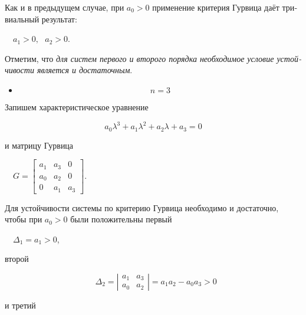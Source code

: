 \documentclass[a4paper]{article}
\newcommand\liststyleWWviiiNumxxxvii{%
\renewcommand\theenumi{\arabic{enumi}}
\renewcommand\theenumii{\arabic{enumii}}
\renewcommand\theenumiii{\arabic{enumiii}}
\renewcommand\labelitemi{}
\renewcommand\labelenumi{\theenumi.}
\renewcommand\labelenumii{\theenumii.}
\renewcommand\labelenumiii{\theenumiii.}
}
\begin{document}
{\begin{russian}\sffamily
Как и в предыдущем случае, при  $a_0>0$ применение критерия Гурвица даёт тривиальный результат:
\end{russian}}

{\begin{russian}\sffamily
\ \  $a_1>0,\text{   }a_2>0$.
\end{russian}}

{\begin{russian}\sffamily
Отметим, что \textit{для систем первого и второго порядка необходимое условие устойчивости является и достаточным}.
\end{russian}}

\liststyleWWviiiNumxxxvii
\begin{itemize}
\item \begin{equation*}
n=3
\end{equation*}
\end{itemize}
{\begin{russian}\sffamily
Запишем характеристическое уравнение
\end{russian}}

\begin{equation*}
a_0λ^3+a_1λ^2+a_2λ+a_3=0
\end{equation*}
{\begin{russian}\sffamily
и матрицу Гурвица
\end{russian}}

{\begin{russian}\sffamily
\ \  $G=\left[\begin{matrix}a_1&a_3&0\\a_0&a_2&0\\0&a_1&a_3\end{matrix}\right]$.
\end{russian}}

{\begin{russian}\sffamily
Для устойчивости системы по критерию Гурвица необходимо и достаточно, чтобы при  $a_0>0$ были положительны первый 
\end{russian}}

{\begin{russian}\sffamily
\ \  $Δ_1=a_1>0$,
\end{russian}}

{\begin{russian}\sffamily
второй
\end{russian}}

\begin{equation*}
\text{      }Δ_2=|\begin{matrix}a_1&a_3\\a_0&a_2\end{matrix}|=a_1a_2-a_0a_3>0
\end{equation*}
{\begin{russian}\sffamily
и третий
\end{russian}}
\end{document}
